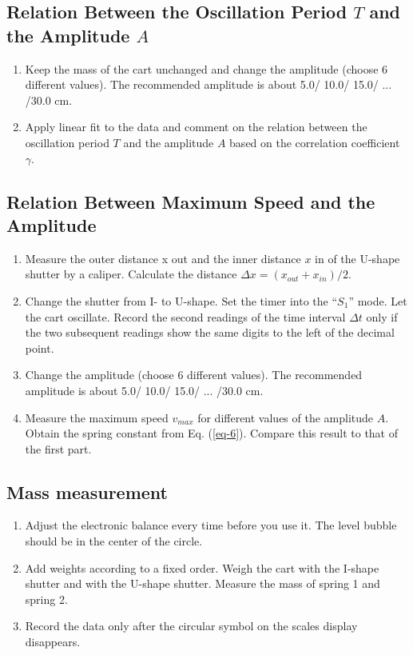\documentclass{article}
\begin{document}
\subsection{Relation Between the Oscillation Period $T$ and the Amplitude $A$}

\begin{enumerate}
	\item
	Keep the mass of the cart unchanged and change the amplitude (choose 6 different
values). The recommended amplitude is about 5.0/ 10.0/ 15.0/ ... /30.0 cm.
	\item
	Apply linear fit to the data and comment on the relation between the oscillation period
$T$ and the amplitude $A$ based on the correlation coefficient $\gamma$.
\end{enumerate}

\subsection{Relation Between Maximum Speed and the Amplitude}

\begin{enumerate}
	\item
	Measure the outer distance x out and the inner distance $x$ in of the U-shape shutter by
a caliper. Calculate the distance $\Delta x=(x_{out}+x_{in})/2$.
	\item
	Change the shutter from I- to U-shape. Set the timer into the ``$S_1$'' mode. Let the cart
oscillate. Record the second readings of the time interval $\Delta t$ only if the two subsequent
readings show the same digits to the left of the decimal point.
	\item
	Change the amplitude (choose 6 different values). The recommended amplitude is
about 5.0/ 10.0/ 15.0/ ... /30.0 cm.
	\item
	Measure the maximum speed $v_{max}$ for different values of the amplitude $A$. Obtain the
spring constant from Eq. (\ref{eq-6}). Compare this result to that of the first part.
\end{enumerate}



\subsection{Mass measurement}
\begin{enumerate}
	\item
	Adjust the electronic balance every time before you use it. The level bubble should be
in the center of the circle.
	\item
	Add weights according to a fixed order. Weigh the cart with the I-shape shutter and
with the U-shape shutter. Measure the mass of spring 1 and spring 2.
	\item
	Record the data only after the circular symbol on the scales display disappears.
\end{enumerate}
\end{document}
